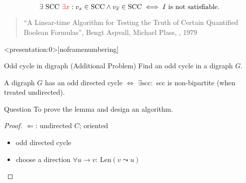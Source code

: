 \begin{frame}

  \begin{theorem}[2SAT]
    \[
	  \exists \text{ SCC } \textcolor{red}{\exists x}: v_x \in \text{SCC} \land v_{\overline{x}} \in \text{SCC} \iff I \text{ is not satisfiable}.
    \]
  \end{theorem}

  \pause
  \begin{center}
  \end{center}

  \pause
  \begin{quote}
	{\footnotesize ``A Linear-time Algorithm for Testing the Truth of Certain Quantified Boolean Formulas'',
	  Bengt Aspvall, Michael Plass, , $1979$}
  \end{quote}
\end{frame}

\begin{frame}<presentation:0>[noframenumbering]
  \begin{exampleblock}{Odd cycle in digraph (Additional Problem)}
    Find an odd cycle in a digraph $G$.
  \end{exampleblock}

  \pause
  \begin{lemma}
    A digraph $G$ has an odd directed cycle $\iff$ $\exists \text{scc}: $ scc is non-bipartite (when treated undirected).
  \end{lemma}

  \pause
  \begin{alertblock}{Question}
	To prove the lemma and design an algorithm.
  \end{alertblock}
  \begin{proof}
    $\Longleftarrow$: undirected $C$; oriented
      \begin{itemize}
    	\item odd directed cycle
    	\item choose a direction $\forall u \to v$: $\text{Len}(v \leadsto u)$ 
      \end{itemize}
  \end{proof}
\end{frame}
